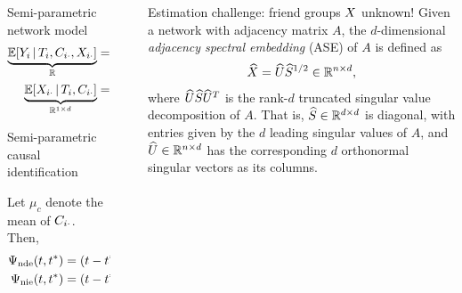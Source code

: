 \documentclass[final]{beamer}
\newlength{\sepwidth}
\newlength{\colwidth}
\newcommand{\separatorcolumn}{\begin{column}{\sepwidth}\end{column}}
\begin{document}
\begin{frame}[t]
\begin{columns}[t]
\begin{column}{\colwidth}
\begin{block}{Semi-parametric network model}
    \begin{equation*} 
      \begin{aligned}
            \underbrace{\E[T_i, \C_{i \cdot}, \X_{i \cdot}]{Y_i}}_{\R}
              & = \underbrace{\betazero}_{\R}
            + \underbrace{T_i}_{\{0, 1\}} \underbrace{\betat}_{\R}
            + \underbrace{\C_{i \cdot}}_{\R^{1 \times p}} \underbrace{\betac}_{\R^{p}}
            + \underbrace{\X_{i \cdot}}_{\R^{1 \times d}} \underbrace{\betax}_{\R^d},
              & \text{(outcome model)}                      \\
            \underbrace{\E[T_i, \C_{i \cdot}]{\X_{i \cdot}}}_{\R^{1 \times d}}
              & = \underbrace{\thetazero}_{\R^{1 \times d}}
            + \underbrace{T_i}_{\{0, 1\}} \underbrace{\thetat}_{\R^{1 \times d}}
            + \underbrace{\C_{i \cdot}}_{\R^{1 \times p}} \underbrace{\Thetac}_{\R^{p \times d}}
            + \underbrace{T_i}_{\{0, 1\}} \underbrace{\C_{i \cdot}}_{\R^{1 \times p}} \underbrace{\Thetatc}_{\R^{p \times d}}.
              & \text{(mediator model)}
      \end{aligned}
    \end{equation*}
  \end{block}

  \begin{block}{Semi-parametric causal identification}

    
    Let $\mu_c$ denote the mean of $C_{i \cdot}$. Then,
    \begin{align*}
        \ndef & = \paren*{t - t^*} \, \betat, ~ \text{ and }                                    \\
        \nief & = \paren*{t - t^*} \, \thetat \, \betax + (t - t^*) \, \mu_c \, \Thetatc \, \betax. 
    \end{align*}

  \end{block}

\end{column}

\separatorcolumn

\begin{column}{\colwidth}
  
  \begin{block}{Estimation challenge: friend groups $X$ unknown!}
    Given a network with adjacency matrix $A$, the $d$-dimensional \emph{adjacency spectral embedding} (ASE) of $A$ is defined as
    \begin{equation*}
        \widehat{X} = \widehat{U} \widehat{S}^{1/2} \in \mathbb{R}^{n \times d},
    \end{equation*}
    where $\widehat{U} \widehat{S} \widehat{U}^T$ is the rank-$d$ truncated singular value decomposition of $A$. That is, $\widehat{S} \in \mathbb{R}^{d \times d}$ is diagonal, with entries given by the $d$ leading singular values of $A$, and $\widehat{U} \in \mathbb{R}^{n \times d}$ has the corresponding $d$ orthonormal singular vectors as its columns.


\end{block}
\end{column}
\end{columns}
\end{frame}
\end{document}
